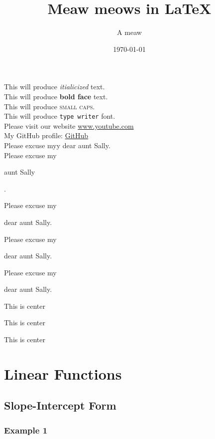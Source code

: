 \documentclass[12pt]{article}
\title{Meaw meows in \LaTeX}
\author{A meaw}
\date{\today}
\begin{document}
\tableofcontents
\maketitle
This will produce \textit{itialicized} text.\\[6pt]
This will produce \textbf{bold face} text.\\[6pt]
This will produce \textsc{small caps}.\\[6pt]
This will produce \texttt{type writer} font.\\[6pt]
Please visit our website \url{www.youtube.com}\\[6pt]
My GitHub profile:  \href{https://github.com/ishmam-br10}{GitHub}\\[6pt]
Please excuse myy dear aunt Sally.\\[6pt]
\vspace{1cm}
Please excuse my \begin{Huge} aunt Sally \end{Huge}.

Please excuse my \begin{small}dear aunt Sally.\end{small}

Please excuse my \begin{scriptsize}dear aunt Sally.\end{scriptsize}

Please excuse my \begin{tiny}dear aunt Sally.\end{tiny}
\vspace{1cm}
\begin{center}
This is center
\end{center}

\begin{flushleft}
This is center
\end{flushleft}

\begin{flushright}
This is center
\end{flushright}
\section{Linear Functions}
	\subsection{Slope-Intercept Form}
		\subsubsection{Example 1}
\end{document}
